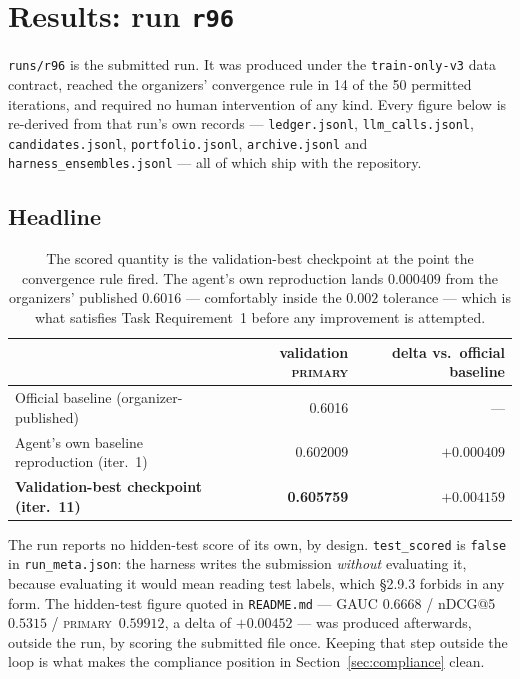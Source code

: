 \documentclass[11pt,a4paper]{article}
\newcommand{\code}[1]{\texttt{#1}}
\newcommand{\file}[1]{\texttt{#1}}
\newcommand{\primary}{\textsc{primary}}
\begin{document}
\section{Results: run \texttt{r96}}
\label{sec:results}

\texttt{runs/r96} is the submitted run. It was produced under the \code{train-only-v3} data
contract, reached the organizers' convergence rule in 14 of the 50 permitted iterations, and
required no human intervention of any kind. Every figure below is re-derived from that run's
own records --- \file{ledger.jsonl}, \file{llm\_calls.jsonl}, \file{candidates.jsonl},
\file{portfolio.jsonl}, \file{archive.jsonl} and \file{harness\_ensembles.jsonl} --- all of
which ship with the repository.

\subsection{Headline}

\begin{table}[htbp]
\centering
\small
\begin{tabular}{@{}lrr@{}}
\toprule
 & \textbf{validation \primary} & \textbf{delta vs.\ official baseline} \\
\midrule
Official baseline (organizer-published)       & 0.6016   & --- \\
Agent's own baseline reproduction (iter.\ 1)  & 0.602009 & $+0.000409$ \\
\textbf{Validation-best checkpoint (iter.\ 11)} & \textbf{0.605759} & $\mathbf{+0.004159}$ \\
\bottomrule
\end{tabular}
\caption{The scored quantity is the validation-best checkpoint at the point the convergence
rule fired. The agent's own reproduction lands $0.000409$ from the organizers' published
$0.6016$ --- comfortably inside the $0.002$ tolerance --- which is what satisfies Task
Requirement~1 before any improvement is attempted.}
\label{tab:headline}
\end{table}

\noindent
The run reports no hidden-test score of its own, by design. \code{test\_scored} is \code{false}
in \file{run\_meta.json}: the harness writes the submission \emph{without} evaluating it,
because evaluating it would mean reading test labels, which \S2.9.3 forbids in any form. The
hidden-test figure quoted in \file{README.md} --- GAUC $0.6668$ / nDCG@5 $0.5315$ / \primary\
$0.59912$, a delta of $+0.00452$ --- was produced afterwards, outside the run, by scoring the
submitted file once. Keeping that step outside the loop is what makes the compliance position
in Section~\ref{sec:compliance} clean.
\end{document}
